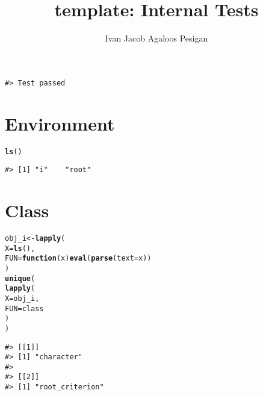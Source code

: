 \documentclass{article}\usepackage[]{graphicx}\usepackage{xcolor}
\title{template: Internal Tests}
\author{Ivan Jacob Agaloos Pesigan}
\date{}
\makeatletter
\newcommand{\hlstd}[1]{\textcolor[rgb]{0.345,0.345,0.345}{#1}}%
\newcommand{\hlkwa}[1]{\textcolor[rgb]{0.161,0.373,0.58}{\textbf{#1}}}%
\newcommand{\hlkwb}[1]{\textcolor[rgb]{0.69,0.353,0.396}{#1}}%
\newcommand{\hlkwc}[1]{\textcolor[rgb]{0.333,0.667,0.333}{#1}}%
\newcommand{\hlkwd}[1]{\textcolor[rgb]{0.737,0.353,0.396}{\textbf{#1}}}%
\newenvironment{kframe}{%
 \def\at@end@of@kframe{}%
 \ifinner\ifhmode%
  \def\at@end@of@kframe{\end{minipage}}%
  \begin{minipage}{\columnwidth}%
 \fi\fi%
 \def\FrameCommand##1{\hskip\@totalleftmargin \hskip-\fboxsep
 \colorbox{shadecolor}{##1}\hskip-\fboxsep
     \hskip-\linewidth \hskip-\@totalleftmargin \hskip\columnwidth}%
 \MakeFramed {\advance\hsize-\width
   \@totalleftmargin\z@ \linewidth\hsize
   \@setminipage}}%
 {\par\unskip\endMakeFramed%
 \at@end@of@kframe}
\newenvironment{knitrout}{}{} %
\makeatother
\begin{document}
\maketitle





\begin{knitrout}
\color{fgcolor}\begin{kframe}


{\ttfamily\noindent\itshape\color{messagecolor}{\#> test-template-foo}}\begin{verbatim}
#> Test passed
\end{verbatim}


{\ttfamily\noindent\itshape\color{messagecolor}{\#> This package was developed by Ivan Jacob Agaloos Pesigan.}}\end{kframe}
\end{knitrout}

\section*{Environment}

\begin{knitrout}
\color{fgcolor}\begin{kframe}
\begin{alltt}
\hlkwd{ls}\hlstd{()}
\end{alltt}
\begin{verbatim}
#> [1] "i"    "root"
\end{verbatim}
\end{kframe}
\end{knitrout}

\section*{Class}

\begin{knitrout}
\color{fgcolor}\begin{kframe}
\begin{alltt}
\hlstd{obj_i} \hlkwb{<-} \hlkwd{lapply}\hlstd{(}
  \hlkwc{X} \hlstd{=} \hlkwd{ls}\hlstd{(),}
  \hlkwc{FUN} \hlstd{=} \hlkwa{function}\hlstd{(}\hlkwc{x}\hlstd{)} \hlkwd{eval}\hlstd{(}\hlkwd{parse}\hlstd{(}\hlkwc{text} \hlstd{= x))}
\hlstd{)}
\hlkwd{unique}\hlstd{(}
  \hlkwd{lapply}\hlstd{(}
    \hlkwc{X} \hlstd{= obj_i,}
    \hlkwc{FUN} \hlstd{= class}
  \hlstd{)}
\hlstd{)}
\end{alltt}
\begin{verbatim}
#> [[1]]
#> [1] "character"
#> 
#> [[2]]
#> [1] "root_criterion"
\end{verbatim}
\end{kframe}
\end{knitrout}

\nocite{R-2021}

\printbibliography
\end{document}
